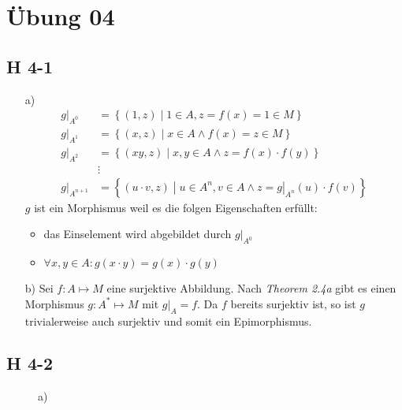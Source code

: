 \documentclass{scrartcl}
\begin{document}
\section{Übung 04}

\subsection{H 4-1}

\begin{itemize}

\item[a)] \begin{align*}
g|_{A^0} &= \left\{(1,z)\;|\;1\in A, z = f(x) = 1 \in M\right\}\\
g|_{A^1} &= \left\{(x,z)\;|\;x\in A \wedge f(x) = z \in M\right\}\\
g|_{A^2} &= \left\{(xy,z)\;|\;x,y\in A \wedge z = f(x)\cdot f(y)\right\}\\
         &\vdots\\
g|_{A^{n+1}} &= \left\{(u\cdot v,z)\;|\;u\in A^n, v \in A \wedge z = g|_{A^n}(u) \cdot f(v)\right\}
\end{align*}
$g$ ist ein Morphismus weil es die folgen Eigenschaften erfüllt:
\begin{itemize}
  \item das Einselement wird abgebildet durch $g|_{A^0}$
  \item $\forall x,y \in A : g(x\cdot y) = g(x) \cdot g(y)$
\end{itemize}
\item[b)] Sei $f : A \mapsto M$ eine surjektive Abbildung. Nach \textit{Theorem 2.4a} gibt es einen Morphismus $g : A^* \mapsto M$ mit $g|_A = f$. Da $f$ bereits surjektiv ist, so ist $g$ trivialerweise auch surjektiv und somit ein Epimorphismus.

\end{itemize}
\newpage

\subsection{H 4-2}

\begin{figure}[h!]
\centering
{}
\caption*{a)}
\end{figure}
\end{document}
